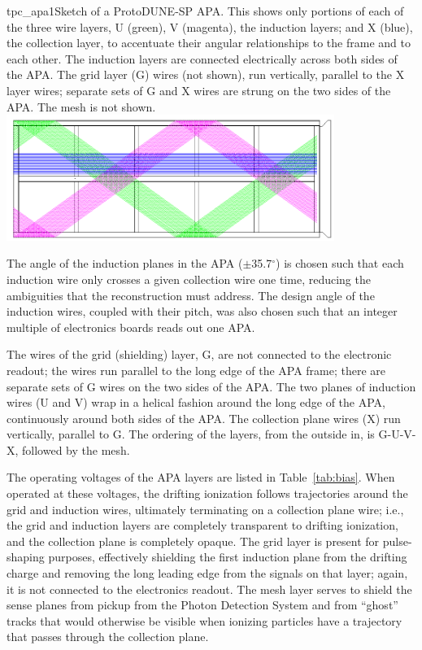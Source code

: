 \begin{cdrfigure}{tpc_apa1}{Sketch of a ProtoDUNE-SP APA. This shows only portions of each of the three wire layers, U (green), V (magenta), the induction layers; and X (blue), the collection layer, to accentuate their angular relationships to the frame and to each other.  The induction layers are connected electrically across both sides of the APA.  The grid layer (G) wires (not shown), run vertically, parallel to the X layer wires;  separate sets of G and X wires are strung on the two sides of the APA.  The mesh is not shown.}
\includegraphics[width=0.8\textwidth, angle=90]{figures/tpc_apa1.png} 
\end{cdrfigure}

The angle of the induction planes in the APA ($\pm$35.7$^{\circ}$) is chosen such that each induction wire only crosses a given collection wire one time, reducing the ambiguities that the reconstruction must address.  The design angle of the induction wires, coupled with their pitch, was also chosen such that an integer multiple of electronics boards reads out one APA.

The wires of the grid (shielding) layer, G,  are not connected to the electronic readout; the wires run parallel to the long edge of the APA frame; there are separate sets of G wires on the two sides of the APA. 
 The two planes of induction wires (U and V) wrap in a helical fashion around the long edge of the APA, continuously around both sides of the APA.  The collection plane wires (X) run vertically, parallel to G.   The ordering of the layers, from the outside in, is G-U-V-X, followed by the mesh.   

The operating voltages of the APA layers are listed in Table~\ref{tab:bias}.  When operated at these voltages, the drifting ionization follows trajectories around the grid and induction wires, ultimately terminating on a collection plane wire; i.e., the grid and induction layers are completely transparent to drifting ionization, and the collection plane is completely opaque.  The grid layer is present for pulse-shaping purposes, effectively shielding the first induction plane from the drifting charge and removing the long leading edge from the signals on that layer; again, it is not connected to the electronics readout. The mesh layer serves to shield the sense planes from pickup from the Photon Detection System and from ``ghost'' tracks that would otherwise be visible when ionizing particles have a trajectory that passes through the collection plane. 

